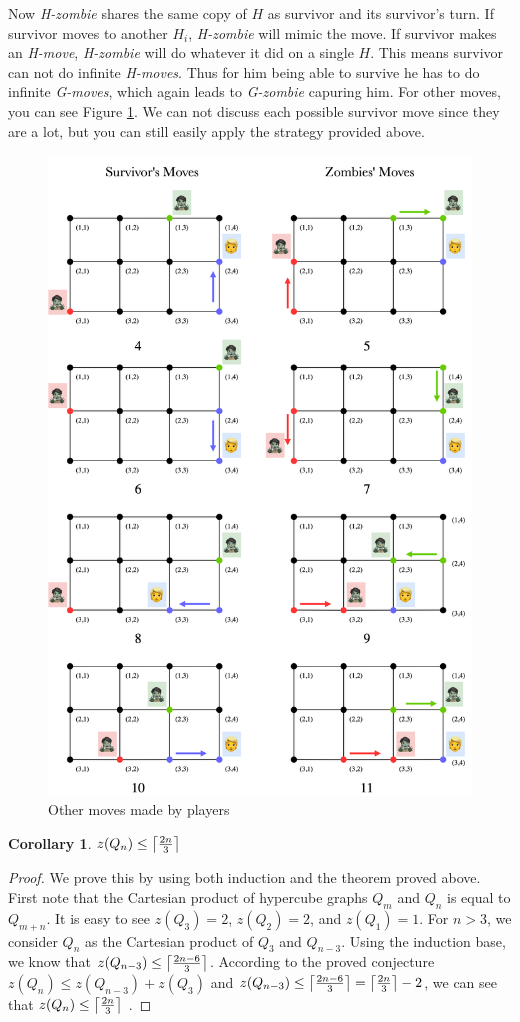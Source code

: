 \documentclass[1p]{elsarticle}
\DeclarePairedDelimiter\ceil{\lceil}{\rceil} \DeclarePairedDelimiter\floor{\lfloor}{\rfloor}
\newtheorem{corollary}[theorem]{Corollary}
\begin{document}
Now {\it H-zombie} shares the same copy of $H$ as survivor and its survivor's turn. If survivor moves to another $H_i$,
{\it H-zombie} will mimic the move. If survivor makes an {\it H-move}, {\it H-zombie} will do whatever it did on a
single $H$. This means survivor can not do infinite {\it H-moves}. Thus for him being able to survive he has to do
infinite {\it G-moves}, which again leads to {\it G-zombie} capuring him. For other moves, you can see Figure
\ref{fig:p6}. We can not discuss each possible survivor move since they are a lot, but you can still easily apply the
strategy provided above. 
\begin{figure}[h!]
	\centering
	\includegraphics[width=0.6\linewidth]{fig/p34m6.png}
	\caption{Other moves made by players}
	\label{fig:p6}
\end{figure}

\begin{corollary}
	\label{C3}
	$z(Q_{n}) \leq \ceil*{\frac{2n}{3}}$
\end{corollary}
\begin{proof}
	We prove this by using both induction and the theorem proved above. First note that the Cartesian product of
	hypercube graphs $Q_{m}$ and $Q_{n}$ is equal to $Q_{m+n}$. It is easy to see $z(Q_3) = 2$, $z(Q_2) = 2$, and
	$z(Q_1) = 1$. For $n > 3$, we consider $Q_n$ as the Cartesian product of $Q_3$ and $Q_{n-3}$. Using the induction
	base, we know that $z(Q_{n-3}) \leq \ceil*{\frac{2n - 6}{3}}$.  According to the proved conjecture $z(Q_n) \leq
	z(Q_{n-3}) + z(Q_3)$ and $z(Q_{n-3}) \leq \ceil*{\frac{2n - 6}{3}} = \ceil*{\frac{2n}{3}} - 2$, we can see that
	$z(Q_n) \leq \ceil*{\frac{2n}{3}}$ .
\end{proof}
\end{document}
